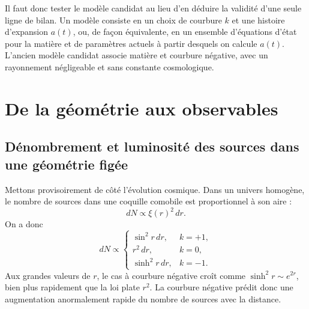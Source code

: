 \begin{classroomqa}
\end{classroomqa}

Il faut donc tester le modèle candidat au lieu d’en déduire la validité d’une seule ligne de bilan. Un modèle consiste en un choix de courbure \(k\) et une histoire d’expansion \(a(t)\), ou, de façon équivalente, en un ensemble d’équations d’état pour la matière et de paramètres actuels à partir desquels on calcule \(a(t)\). L’ancien modèle candidat associe matière et courbure négative, avec un rayonnement négligeable et sans constante cosmologique.

\section{De la géométrie aux observables}

\subsection{Dénombrement et luminosité des sources dans une géométrie figée}

Mettons provisoirement de côté l’évolution cosmique. Dans un univers homogène, le nombre de sources dans une coquille comobile est proportionnel à son aire :
\begin{equation}
dN\propto \xi(r)^2\,dr.
\label{eq:c06-shell-count}
\end{equation}
On a donc
\begin{equation}
dN\propto
\begin{cases}
\sin^2r\,dr, & k=+1,\\
r^2\,dr, & k=0,\\
\sinh^2r\,dr, & k=-1.
\end{cases}
\end{equation}
Aux grandes valeurs de \(r\), le cas à courbure négative croît comme \(\sinh^2r\sim e^{2r}\), bien plus rapidement que la loi plate \(r^2\). La courbure négative prédit donc une augmentation anormalement rapide du nombre de sources avec la distance.

